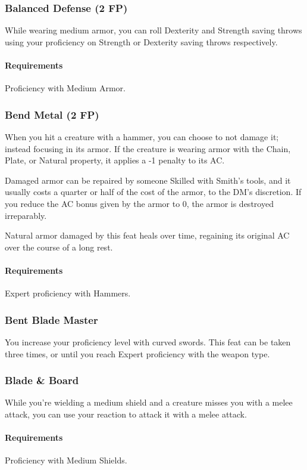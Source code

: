 \subsubsection{Balanced Defense (2 FP)} \label{feat::balanceddefense}
    While wearing medium armor, you can roll Dexterity and Strength saving throws using your proficiency on Strength or Dexterity saving throws respectively.
    \paragraph{Requirements} Proficiency with Medium Armor.
\subsubsection{Bend Metal (2 FP)} \label{feat::bendmetal}
    When you hit a creature with a hammer, you can choose to not damage it; instead focusing in its armor.
    If the creature is wearing armor with the Chain, Plate, or Natural property, it applies a -1 penalty to its AC.

    Damaged armor can be repaired by someone Skilled with Smith's tools, and it usually costs a quarter or half of the cost of the armor, to the DM's discretion.
    If you reduce the AC bonus given by the armor to 0, the armor is destroyed irreparably.

    Natural armor damaged by this feat heals over time, regaining its original AC over the course of a long rest.
    \paragraph{Requirements} Expert proficiency with Hammers.
\subsubsection{Bent Blade Master} \label{feat::bentblademaster}
    You increase your proficiency level with curved swords.
    This feat can be taken three times, or until you reach Expert proficiency with the weapon type.
\subsubsection{Blade \& Board} \label{feat::bladeandboard}
    While you're wielding a medium shield and a creature misses you with a melee attack, you can use your reaction to attack it with a melee attack.
    \paragraph{Requirements} Proficiency with Medium Shields.
